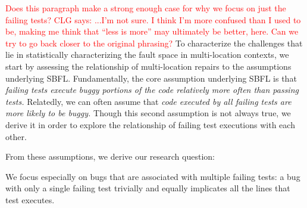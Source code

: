 \documentclass[10pt, conference]{IEEEtran}
\newcommand\todo[1]{\textcolor{red}{#1}}
\begin{document}
\todo{Does this paragraph make a strong enough case for why we focus on just the failing 
tests?}
\todo{CLG says: ...I'm not sure.  I think I'm more confused than I used to be,
  making me think that ``less is more'' may ultimately be better, here.  Can we
  try to go back closer to the original phrasing?}
To characterize the challenges that lie in statistically characterizing the
fault space in multi-location contexts, we start by assessing the 
relationship of multi-location repairs to the assumptions underlying SBFL. 
Fundamentally, the core assumption underlying SBFL is that \emph{failing tests
execute buggy portions of the code relatively more often than passing tests.} Relatedly, we can 
often assume that \emph{code executed by all failing tests are more likely to be buggy.} Though 
this second assumption is not 
always true, we derive it in order to explore the relationship of failing test executions with each 
other.






From these assumptions, we derive our research question: 


We focus especially on bugs that are associated with multiple failing tests: a bug
with only a single failing test trivially and equally implicates all the lines
that test executes. 

\end{document}
